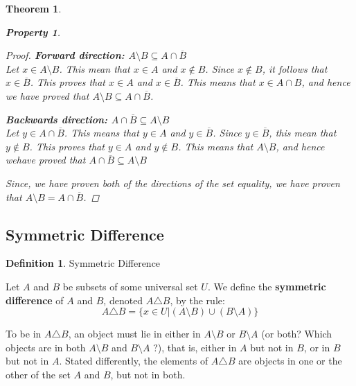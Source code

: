 \documentclass{book}
\newtheorem{theorem}{Theorem}[section]
\newtheorem{property}{Property}[theorem]
\theoremstyle{definition}
\newtheorem{definition}{Definition}[section]
\theoremstyle{remark}
\begin{document}
\begin{theorem}
\begin{property}
\begin{proof}
            \textbf{Forward direction: $A \setminus B \subseteq A \cap \overline{B}$ } \\ 
                Let $x \in A \setminus B$. This mean that $x \in A$ and $x \notin B$. Since $x \notin B$, it follows that $x \in \overline{B}$. This proves that $x \in A$ and $x \in \overline{B}$. This means that $x \in A \cap B$, and hence we have proved that $A \setminus B \subseteq A \cap \overline{B}$.
            
            \textbf{Backwards direction: $A \cap \overline{B} \subseteq A \setminus B$} \\
                Let $y \in A \cap \overline{B}$. This means that $y \in A$ and $y \in \overline{B}$. Since $y \in \overline{B}$, this mean that $y \notin B$. This proves that $y \in A$ and $y \notin B$. This means that $A \setminus B$, and hence wehave proved that $A \cap \overline{B} \subseteq A \setminus B$
            
            Since, we have proven both of the directions of the set equality, we have proven that $A \setminus B = A \cap \overline{B}$. 
        \end{proof}
    \end{property}
\end{theorem}


\newpage
\subsection{Symmetric Difference}


\begin{definition}
Symmetric Difference \\

    \begin{tcolorbox}
        Let $A$ and $B$ be subsets of some universal set $U$. We define the  \textbf{symmetric difference} of $A$ and $B$, denoted $A \triangle B$, by the rule:
         \begin{equation*}
                A \triangle B = \{x \in U | (A \setminus B) \cup (B \setminus A) \}
            \end{equation*}
    \end{tcolorbox}    
        
    To be in $A \triangle B$, an object must lie in either in $A \setminus B$ or $B \setminus A$ (or both? Which objects are in both $A \setminus B$ and $B \setminus A$ ?), that is, either in $A$ but not in $B$, or in $B$ but not in $A$. Stated differently, the elements of $A \triangle B$ are objects in one or the other of the set $A$ and $B$, but not in both. 
\end{definition}
\end{document}
